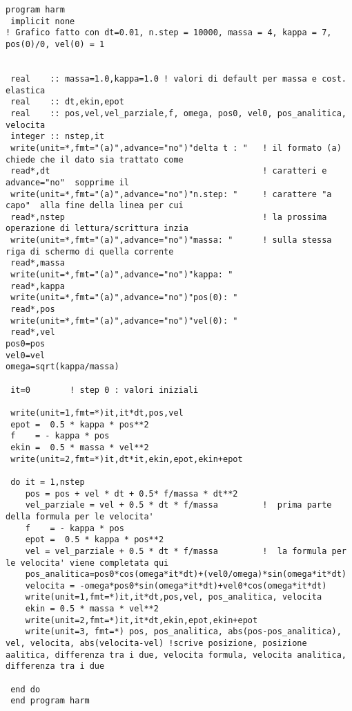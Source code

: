 \documentclass[a4paper]{article}
\begin{document}
\begin{lstlisting}[firstnumber=1]
  program harm
 implicit none
! Grafico fatto con dt=0.01, n.step = 10000, massa = 4, kappa = 7, pos(0)/0, vel(0) = 1


 real    :: massa=1.0,kappa=1.0 ! valori di default per massa e cost. elastica
 real    :: dt,ekin,epot
 real    :: pos,vel,vel_parziale,f, omega, pos0, vel0, pos_analitica, velocita
 integer :: nstep,it
 write(unit=*,fmt="(a)",advance="no")"delta t : "   ! il formato (a) chiede che il dato sia trattato come
 read*,dt                                           ! caratteri e advance="no"  sopprime il
 write(unit=*,fmt="(a)",advance="no")"n.step: "     ! carattere "a capo"  alla fine della linea per cui
 read*,nstep                                        ! la prossima operazione di lettura/scrittura inzia
 write(unit=*,fmt="(a)",advance="no")"massa: "      ! sulla stessa riga di schermo di quella corrente
 read*,massa
 write(unit=*,fmt="(a)",advance="no")"kappa: "
 read*,kappa
 write(unit=*,fmt="(a)",advance="no")"pos(0): "
 read*,pos
 write(unit=*,fmt="(a)",advance="no")"vel(0): "
 read*,vel
pos0=pos
vel0=vel
omega=sqrt(kappa/massa)

 it=0        ! step 0 : valori iniziali

 write(unit=1,fmt=*)it,it*dt,pos,vel
 epot =  0.5 * kappa * pos**2
 f    = - kappa * pos
 ekin =  0.5 * massa * vel**2
 write(unit=2,fmt=*)it,dt*it,ekin,epot,ekin+epot

 do it = 1,nstep
    pos = pos + vel * dt + 0.5* f/massa * dt**2
    vel_parziale = vel + 0.5 * dt * f/massa         !  prima parte della formula per le velocita'
    f    = - kappa * pos
    epot =  0.5 * kappa * pos**2
    vel = vel_parziale + 0.5 * dt * f/massa         !  la formula per le velocita' viene completata qui
    pos_analitica=pos0*cos(omega*it*dt)+(vel0/omega)*sin(omega*it*dt)
    velocita = -omega*pos0*sin(omega*it*dt)+vel0*cos(omega*it*dt)
    write(unit=1,fmt=*)it,it*dt,pos,vel, pos_analitica, velocita
    ekin = 0.5 * massa * vel**2
    write(unit=2,fmt=*)it,it*dt,ekin,epot,ekin+epot
    write(unit=3, fmt=*) pos, pos_analitica, abs(pos-pos_analitica), vel, velocita, abs(velocita-vel) !scrive posizione, posizione aalitica, differenza tra i due, velocita formula, velocita analitica, differenza tra i due

 end do
 end program harm

\end{lstlisting}
\end{document}
